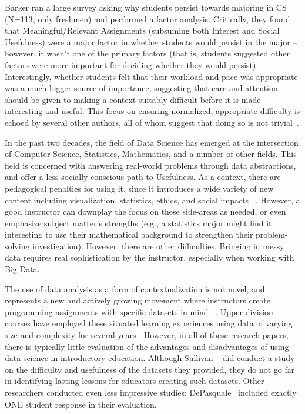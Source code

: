 Barker ran a large survey asking why students persist towards majoring in CS~\cite{Barker:2009} (N=113, only freshmen) and performed a factor analysis.
Critically, they found that Meaningful/Relevant Assignments (subsuming both Interest and Social Usefulness) were a major factor in whether students would persist in the major -- however, it wasn't one of the primary factors (that is, students suggested other factors were more important for deciding whether they would persist).
Interestingly, whether students felt that their workload and pace was appropriate was a much bigger source of importance, suggesting that care and attention should be given to making a context suitably difficult before it is made interesting and useful.
This focus on ensuring normalized, appropriate difficulty is echoed by several other authors, all of whom suggest that doing so is not trivial~\cite{Rader:2011, Stevenson:2006}.

In the past two decades, the field of Data Science has emerged at the intersection of Computer Science, Statistics, Mathematics, and a number of other fields.
This field is concerned with answering real-world problems through data abstractions, and offer a less socially-conscious path to Usefulness.
As a context, there are pedagogical penalties for using it, since it introduces a wide variety of new content including visualization, statistics, ethics, and social impacts ~\cite{Anderson:2015-DP2}.
However, a good instructor can downplay the focus on these side-areas as needed, or even emphasize subject matter's strengths (e.g., a statistics major might find it interesting to use their mathematical background to strengthen their problem-solving investigation).
However, there are other difficulties. Bringing in messy data requires real sophistication by the instructor, especially when working with Big Data.

The use of data analysis as a form of contextualization is not novel, and represents a new and actively growing movement where instructors create programming assignments with specific datasets in mind ~\cite{Anderson, Sullivan:2013, Hall-Holt:2015, DePasquale:2006}.
Upper division courses have employed these situated learning experiences using data of varying size and complexity for several years \cite{Egger, datamining, Waldman}.
However, in all of these research papers, there is typically little evaluation of the advantages and disadvantages of using data science in introductory education.
Although Sullivan ~\cite{Sullivan:2013} did conduct a study on the difficulty and usefulness of the datasets they provided, they do not go far in identifying lasting lessons for educators creating such datasets.
Other researchers conducted even less impressive studies: DePasquale~\cite{DePasquale:2006} included exactly ONE student response in their evaluation.
